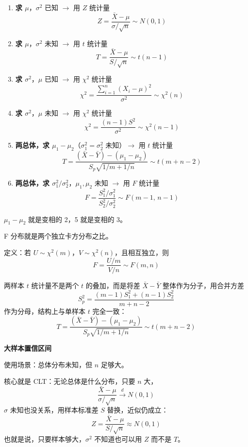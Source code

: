 \begin{enumerate}
    \item \textbf{求 $\mu$}，$\sigma^2$ 已知 $\rightarrow$ 用 $Z$ 统计量
    $$Z = \frac{\bar{X} - \mu}{\sigma/\sqrt{n}} \sim N(0,1)$$

    \item \textbf{求 $\mu$}，$\sigma^2$ 未知 $\rightarrow$ 用 $t$ 统计量
    $$T = \frac{\bar{X} - \mu}{S/\sqrt{n}} \sim t(n-1)$$

    \item \textbf{求 $\sigma^2$}，$\mu$ 已知 $\rightarrow$ 用 $\chi^2$ 统计量
    $$\chi^2 = \frac{\sum_{i=1}^n(X_i-\mu)^2}{\sigma^2} \sim \chi^2(n)$$

    \item \textbf{求 $\sigma^2$}，$\mu$ 未知 $\rightarrow$ 用 $\chi^2$ 统计量
    $$\chi^2 = \frac{(n-1)S^2}{\sigma^2} \sim \chi^2(n-1)$$

    \item \textbf{两总体，求 $\mu_1-\mu_2$}（$\sigma_1^2=\sigma_2^2$ 未知）$\rightarrow$ 用 $t$ 统计量
    $$T = \frac{(\bar{X}-\bar{Y})-(\mu_1-\mu_2)}{S_p\sqrt{1/m+1/n}} \sim t(m+n-2)$$

    \item \textbf{两总体，求 $\sigma_1^2/\sigma_2^2$}，$\mu_1,\mu_2$ 未知 $\rightarrow$ 用 $F$ 统计量
    $$F = \frac{S_1^2/\sigma_1^2}{S_2^2/\sigma_2^2} \sim F(m-1,\,n-1)$$
\end{enumerate}
\begin{dxtips}
$\mu_1 - \mu_2$ 就是变相的 2，5 就是变相的 3。

F 分布就是两个独立卡方分布之比。

定义：若 $U \sim \chi^2(m)$，$V \sim \chi^2(n)$，且相互独立，则
$$F = \frac{U/m}{V/n} \sim F(m, n)$$
\end{dxtips}
\begin{dxtips}
   两样本 $t$ 统计量不是两个 $t$ 的叠加，而是将差 $\bar{X}-\bar{Y}$ 整体作为分子，用合并方差
$$S_p^2 = \frac{(m-1)S_1^2+(n-1)S_2^2}{m+n-2}$$
作为分母，结构上与单样本 $t$ 完全一致：
$$T = \frac{(\bar{X}-\bar{Y})-(\mu_1-\mu_2)}{S_p\sqrt{1/m+1/n}} \sim t(m+n-2)$$
\end{dxtips}
 \textbf{大样本置信区间}
\begin{note}
   

使用场景：总体分布未知，但 $n$ 足够大。

核心就是 CLT：无论总体是什么分布，只要 $n$ 大，
$$\frac{\bar{X} - \mu}{\sigma/\sqrt{n}} \xrightarrow{d} N(0,1)$$
$\sigma$ 未知也没关系，用样本标准差 $S$ 替换，近似仍成立：
$$Z = \frac{\bar{X} - \mu}{S/\sqrt{n}} \approx N(0,1)$$
也就是说，只要样本够大，$\sigma^2$ 不知道也可以用 $Z$ 而不是 $T$。
\end{note}
